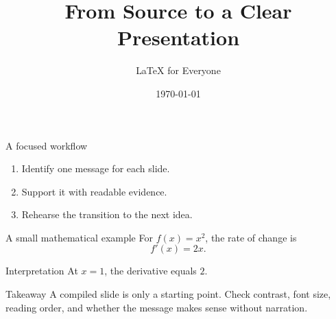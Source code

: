 \documentclass[aspectratio=169]{beamer}
\title{From Source to a Clear Presentation}
\author{LaTeX for Everyone}
\date{\today}
\begin{document}
\begin{frame}
  \titlepage
\end{frame}

\begin{frame}{A focused workflow}
  \begin{enumerate}
    \item Identify one message for each slide.
    \item Support it with readable evidence.
    \item Rehearse the transition to the next idea.
  \end{enumerate}
\end{frame}

\begin{frame}{A small mathematical example}
  For \(f(x)=x^2\), the rate of change is
  \[
    f'(x)=2x.
  \]
  \begin{block}{Interpretation}
    At \(x=1\), the derivative equals \(2\).
  \end{block}
\end{frame}

\begin{frame}{Takeaway}
  A compiled slide is only a starting point. Check contrast, font size,
  reading order, and whether the message makes sense without narration.
\end{frame}
\end{document}
